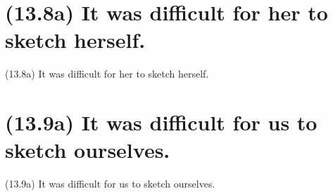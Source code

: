 \documentclass{article}
\begin{document}
\bigbreak
\begin{minipage}{\textwidth}
\end{minipage}
\bigbreak

\clearpage

%
%

\section*{(13.8a) It was difficult for her to sketch herself.}

\bigbreak
\begin{enumerate*}
\item[(13.8a)] It was difficult for her to sketch herself.
\end{enumerate*}
\bigbreak

\bigbreak
\begin{minipage}{\textwidth}
\end{minipage}
\bigbreak

\clearpage

%
%

\section*{(13.9a) It was difficult for us to sketch ourselves.}

\bigbreak
\begin{enumerate*}
\item[(13.9a)] It was difficult for us to sketch ourselves.
\end{enumerate*}
\bigbreak
\end{document}
